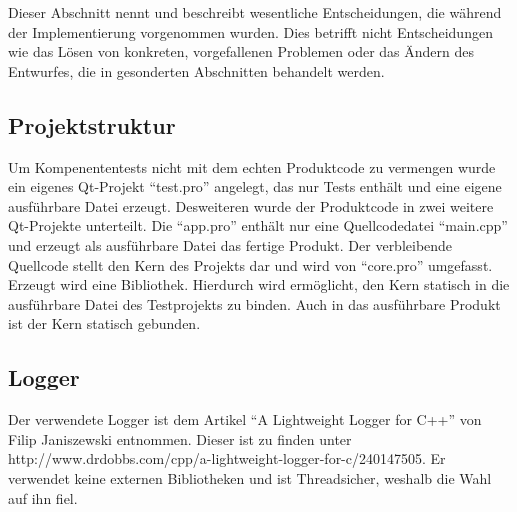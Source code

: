 Dieser Abschnitt nennt und beschreibt wesentliche Entscheidungen, die während der Implementierung vorgenommen wurden. Dies betrifft nicht Entscheidungen wie das Lösen von konkreten, vorgefallenen Problemen oder das Ändern des Entwurfes, die in gesonderten Abschnitten behandelt werden.

\subsection{Projektstruktur}
Um Kompenententests nicht mit dem echten Produktcode zu vermengen wurde ein eigenes Qt-Projekt \enquote{test.pro}
angelegt, das nur Tests enthält und eine eigene ausführbare Datei erzeugt. Desweiteren wurde der Produktcode in zwei weitere Qt-Projekte unterteilt. Die \enquote{app.pro} enthält nur eine Quellcodedatei \enquote{main.cpp} und erzeugt als ausführbare Datei das fertige Produkt. Der verbleibende Quellcode stellt den Kern des Projekts dar und wird von \enquote{core.pro} umgefasst. Erzeugt wird eine Bibliothek. Hierdurch wird ermöglicht, den Kern statisch in die ausführbare Datei des Testprojekts zu binden. Auch in das ausführbare Produkt ist der Kern statisch gebunden.

\subsection{Logger}
Der verwendete Logger ist dem Artikel \enquote{A Lightweight Logger for C++} von Filip Janiszewski entnommen.
Dieser ist zu finden unter http://www.drdobbs.com/cpp/a-lightweight-logger-for-c/240147505.
Er verwendet keine externen Bibliotheken und ist Threadsicher, weshalb die Wahl auf ihn fiel.
